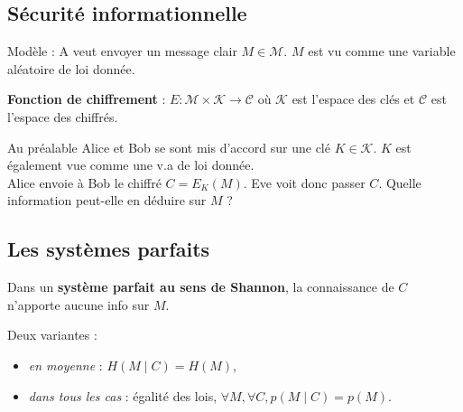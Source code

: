 \subsection{Sécurité informationnelle}

	{\centering
	}
	
	Modèle : A veut envoyer un message clair $M \in \mathcal{M}$. $M$ est vu comme une variable aléatoire de loi donnée.
	
	\begin{defn}
		\textbf{Fonction de chiffrement} : $E \colon \mathcal{M} \times \mathcal{K} \to \mathcal{C}$ où $\mathcal{K}$ est l'espace des clés et $\mathcal{C}$ est l'espace des chiffrés.
	\end{defn}
	
	Au préalable Alice et Bob se sont mis d'accord sur une clé $K \in \mathcal{K}$.
	$K$ est également vue comme une v.a de loi donnée.\\
	
	Alice envoie à Bob le chiffré $C = E_K(M)$.
	Eve voit donc passer $C$.
	Quelle information peut-elle en déduire sur $M$ ?
	

\subsection{Les systèmes parfaits}
	
	\begin{defn}
		Dans un \textbf{système parfait au sens de Shannon}, la connaissance de $C$ n'apporte aucune info sur $M$.
	\end{defn}
	
	Deux variantes :
	\begin{itemize}
		\item[\textbullet] \textit{en moyenne} : $H(M \mid C) = H(M)$,
		\item[\textbullet] \textit{dans tous les cas} : égalité des lois, $\forall M, \forall C, p(M \mid C) = p(M)$.
	\end{itemize}
	
